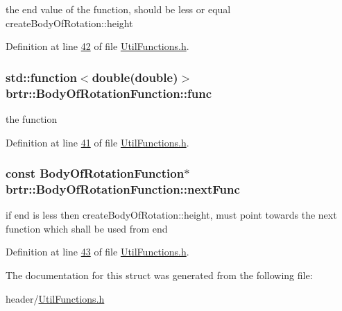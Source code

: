 the end value of the function, should be less or equal create\+Body\+Of\+Rotation\+::height 



Definition at line \hyperlink{_util_functions_8h_source_l00042}{42} of file \hyperlink{_util_functions_8h_source}{Util\+Functions.\+h}.

\hypertarget{structbrtr_1_1_body_of_rotation_function_a5fda598eb0a63696b059e3a27c01142b}{
\subsubsection[{func}]{\setlength{\rightskip}{0pt plus 5cm}std\+::function$<$double(double)$>$ brtr\+::\+Body\+Of\+Rotation\+Function\+::func}}\label{structbrtr_1_1_body_of_rotation_function_a5fda598eb0a63696b059e3a27c01142b}


the function 



Definition at line \hyperlink{_util_functions_8h_source_l00041}{41} of file \hyperlink{_util_functions_8h_source}{Util\+Functions.\+h}.

\hypertarget{structbrtr_1_1_body_of_rotation_function_ad7df29eaeb2504928488691196cc06eb}{
\subsubsection[{next\+Func}]{\setlength{\rightskip}{0pt plus 5cm}const {\bf Body\+Of\+Rotation\+Function}$\ast$ brtr\+::\+Body\+Of\+Rotation\+Function\+::next\+Func}}\label{structbrtr_1_1_body_of_rotation_function_ad7df29eaeb2504928488691196cc06eb}


if end is less then create\+Body\+Of\+Rotation\+::height, must point towards the next function which shall be used from end 



Definition at line \hyperlink{_util_functions_8h_source_l00043}{43} of file \hyperlink{_util_functions_8h_source}{Util\+Functions.\+h}.



The documentation for this struct was generated from the following file\+:\begin{DoxyCompactItemize}
\item 
header/\hyperlink{_util_functions_8h}{Util\+Functions.\+h}\end{DoxyCompactItemize}
